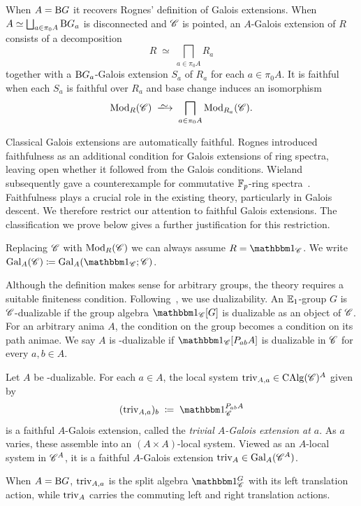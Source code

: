 \documentclass[english,svgnames,table]{article}
\begin{document}
\begin{remark}
    When $A = \mathrm{B} G$ it recovers Rognes' definition of Galois extensions.
    When $A \simeq \bigsqcup_{a \in \pi_0 A} \mathrm{B} G_a$ is disconnected and $\mathscr{C}$ is pointed, an $A$-Galois extension of $R$ consists of a decomposition
    \begin{equation*}
        R \;\simeq\; \bigsqcap_{a \in \pi_0 A} R_a
    \end{equation*}
    together with a $\mathrm{B} G_a$-Galois extension $S_a$ of $R_a$ for each $a \in \pi_0 A$.
    It is faithful when each $S_a$ is faithful over $R_a$ and base change induces an isomorphism
    \begin{equation*}
        \Mod_R(\cC) \;\isotoo\; \bigsqcap_{a \in \pi_0 A} \Mod_{R_a}(\cC).
    \end{equation*}
\end{remark}

\begin{remark}
    Classical Galois extensions are automatically faithful.
    Rognes introduced faithfulness as an additional condition for Galois extensions of ring spectra, leaving open whether it followed from the Galois conditions.
    Wieland subsequently gave a counterexample for commutative $\mathbb{F}_{p}$-ring spectra~\cite{Rognes-unfaithful}.
    Faithfulness plays a crucial role in the existing theory, particularly in Galois descent. We therefore restrict our attention to faithful Galois extensions. 
    The classification we prove below gives a further justification for this restriction.
\end{remark}

Replacing $\mathscr{C}$ with $\operatorname{Mod}_R(\mathscr{C})$ we can always assume $R = \ounit_{\cC}$. We write $\Gal_{A}(\cC) \coloneq \Gal_{A}(\ounit_{\cC}; \cC)$.

Although the definition makes sense for arbitrary groups, the theory requires a suitable finiteness condition. Following~\cite[\S~3.4]{Rognes-2008-Galois}, we use dualizability.
An $\mathbb{E}_1$-group $G$ is $\mathscr{C}$-dualizable if the group algebra $\ounit_{\cC}[G]$ is dualizable as an object of $\mathscr{C}$.
For an arbitrary anima $A$, the condition on the group becomes a condition on its path animae.
We say $A$ is \CO-dualizable if $\ounit_{\cC}[\Path_{ab}A]$ is dualizable in $\mathscr{C}$ for every $a,b \in A$.

\begin{definition}
    Let $A$ be \CO-dualizable.
    For each $a \in A$, the local system $\mathrm{triv}_{A,a} \in \operatorname{CAlg}(\mathscr{C})^A$ given by
    \begin{equation*}
        (\triv_{A,a})_b \;\coloneq\; \ounit_{\cC}^{\Path_{ab}A}
    \end{equation*}
    is a faithful $A$-Galois extension, called the \emph{trivial $A$-Galois extension at $a$}.
    As $a$ varies, these assemble into an $(A \times A)$-local system.
    Viewed as an $A$-local system in $\mathscr{C}^A$, it is a faithful $A$-Galois extension $\mathrm{triv}_A \in \mathrm{Gal}_A(\mathscr{C}^A)$.
    
    When $A = \mathrm{B} G$, $\mathrm{triv}_{A,a}$ is the split algebra $\ounit_{\cC}^G$ with its left translation action, while $\mathrm{triv}_A$ carries the commuting left and right translation actions.
\end{definition}
\end{document}
